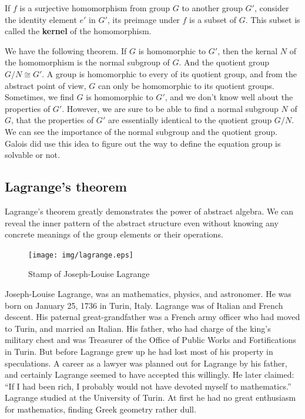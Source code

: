 \documentclass{article}
\begin{document}
\begin{definition}
If $f$ is a surjective homomorphism from group $G$ to another group $G'$, consider the identity element $e'$ in $G'$, its preimage under $f$ is a subset of $G$. This subset is called the \textbf{kernel} of the homomorphism.
\end{definition}

We have the following theorem. If $G$ is homomorphic to $G'$, then the kernal $N$ of the homomorphism is the normal subgroup of $G$. And the quotient group $G/N \cong G'$. A group is homomorphic to every of its quotient group, and from the abstract point of view, $G$ can only be homomorphic to its quotient groups. Sometimes, we find $G$ is homomorphic to $G'$, and we don't know well about the properties of $G'$. However, we are sure to be able to find a normal subgroup $N$ of $G$, that the properties of $G'$ are essentially identical to the quotient group $G/N$. We can see the importance of the normal subgroup and the quotient group. Galois did use this idea to figure out the way to define the equation group is solvable or not.

\begin{Exercise}
\end{Exercise}

\subsection{Lagrange's theorem}

Lagrange's theorem greatly demonstrates the power of abstract algebra. We can reveal the inner pattern of the abstract structure even without knowing any concrete meanings of the group elements or their operations.

\begin{figure}
 \centering
 \texttt{[image: img/lagrange.eps]}
 \captionsetup{labelformat=empty}
 \caption{Stamp of Joseph-Louise Lagrange}
 \label{fig:Lagrange}
\end{figure}

Joseph-Louise Lagrange, was an mathematics, physics, and astronomer. He was born on January 25, 1736 in Turin, Italy. Lagrange was of Italian and French descent. His paternal great-grandfather was a French army officer who had moved to Turin, and married an Italian. His father, who had charge of the king's military chest and was Treasurer of the Office of Public Works and Fortifications in Turin. But before Lagrange grew up he had lost most of his property in speculations. A career as a lawyer was planned out for Lagrange by his father, and certainly Lagrange seemed to have accepted this willingly. He later claimed: ``If I had been rich, I probably would not have devoted myself to mathematics.'' Lagrange studied at the University of Turin. At first he had no great enthusiasm for mathematics, finding Greek geometry rather dull.
\end{document}
